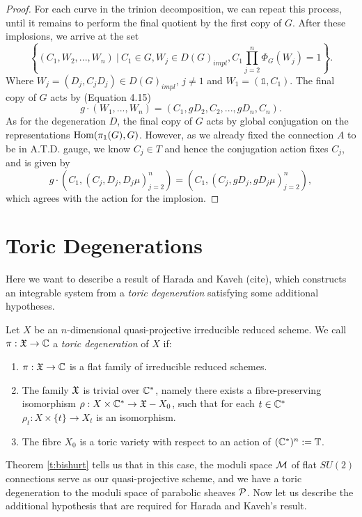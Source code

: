 \begin{proof}
		For each curve in the trinion decomposition, we can repeat this process, until it remains to perform the final quotient by the first copy of $G$. After these implosions, we arrive at the set
		\begin{equation}
			\left\{
			(C_1,W_2,...,W_n) ~|~ C_1 \in G, W_j \in D(G)_{impl}, C_1\prod_{j=2}^{n}\Phi_G(W_j) = 1	
			\right\}. 
		\end{equation}
		Where $W_j = (D_j,C_jD_j) \in D(G)_{impl}$, $j\neq 1$ and $W_1 = (\mathds{1},C_1)$. The final copy of $G$ acts by (Equation 4.15)
		\begin{equation}
			g\cdot(W_1,...,W_{n}) = (C_1,gD_2,C_2,...,gD_n, C_n). 
		\end{equation}
		As for the degeneration $D$, the final copy of $G$ acts by global conjugation on the representations $\text{Hom}(\pi_1(G),G)$. However, as we already fixed the connection $A$ to be in A.T.D. gauge, we know $C_j \in T$ and hence the conjugation action fixes $C_j$, and is given by
		\begin{equation}
			g \cdot (C_1,(C_j,D_j, D_j\mu)_{j=2}^n) = (C_1, (C_j, gD_j, gD_j\mu)_{j=2}^n),
		\end{equation}
		which agrees with the action for the implosion. 
	\end{proof}
	
	\section{Toric Degenerations}
	Here we want to describe a result of Harada and Kaveh (cite), which constructs an integrable system from a \textit{toric degeneration} satisfying some additional hypotheses. 
	\begin{definition}
		\label{d:toricdegen}
		Let $X$ be an $n$-dimensional quasi-projective irreducible reduced scheme. We call $\pi: \mathfrak{X}\to\mathbb{C}$ a \emph{toric degeneration} of $X$ if:
		\begin{enumerate}
			\item $\pi:\mathfrak{X}\to\mathbb{C}$ is a flat family of irreducible reduced schemes.
			\item The family $\mathfrak{X}$ is trivial over $\mathbb{C}^\ast$, namely there exists a fibre-preserving isomorphism $\rho:X\times\mathbb{C}^\ast \to \mathfrak{X} - X_0$, such that for each $t\in \mathbb{C}^\ast$ $\rho_t:X\times\{t\} \to X_t$ is an isomorphism.
			\item The fibre $X_0$ is a toric variety with respect to an action of $(\mathbb{C}^\ast)^n := \mathbb{T}$.
		\end{enumerate}
	\end{definition}
	Theorem \ref{t:bishurt} tells us that in this case, the moduli space $\mathcal{M}$ of flat $SU(2)$ connections serve as our quasi-projective scheme, and we have a toric degeneration to the moduli space of parabolic sheaves $\mathcal{P}$. Now let us describe the additional hypothesis that are required for Harada and Kaveh's result.
	
